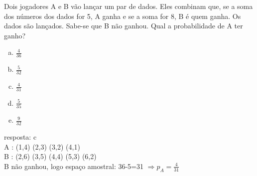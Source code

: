 \begin{ex}
 	 Dois jogadores A e B vão lançar um par de dados. Eles combinam que, se a soma dos números dos dados for 5, A ganha e se a soma for 8, B é quem ganha. Os dados são lançados. Sabe-se que B não ganhou. Qual a probabilidade de A ter ganho?
    \begin{enumerate}[(a)]
    \item $\frac{4}{36}$
    \item $\frac{5}{32}$
    \item $\frac{4}{31}$
    \item $\frac{5}{35}$
    \item $\frac{9}{32}$
    \end{enumerate}
       \begin{sol}
         resposta: c \\
         A : (1,4) (2,3) (3,2) (4,1) \\
         B : (2,6) (3,5) (4,4) (5,3) (6,2) \\
         B não ganhou, logo espaço amostral: 36-5=31 
         $ \Longrightarrow p_A = \frac{4}{31}$
       \end{sol}
\end{ex}